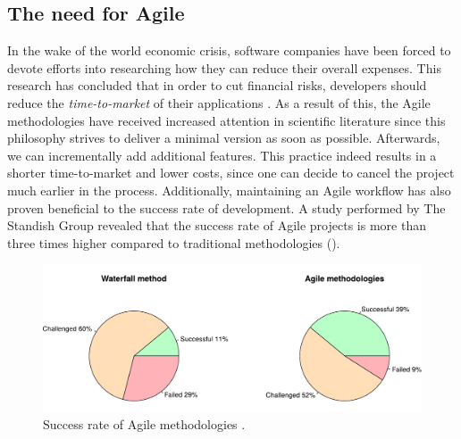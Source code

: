 
\subsection{The need for Agile}
In the wake of the world economic crisis, software companies have been forced to devote efforts into researching how they can reduce their overall expenses. This research has concluded that in order to cut financial risks, developers should reduce the \emph{time-to-market} of their applications \cite{ionel2009}. As a result of this, the Agile methodologies have received increased attention in scientific literature since this philosophy strives to deliver a minimal version as soon as possible. Afterwards, we can incrementally add additional features. This practice indeed results in a shorter time-to-market and lower costs, since one can decide to cancel the project much earlier in the process. Additionally, maintaining an Agile workflow has also proven beneficial to the success rate of development. A study performed by The Standish Group revealed that the success rate of Agile projects is more than three times higher compared to traditional methodologies ().

\begin{figure}[htbp!]
	\centering
	\includegraphics[width=\textwidth]{assets/charts/agile-success-rate.pdf}
	\caption{Success rate of Agile methodologies \cite{standish2015chaos}.}
	\label{fig:agile-success-rate}
\end{figure}